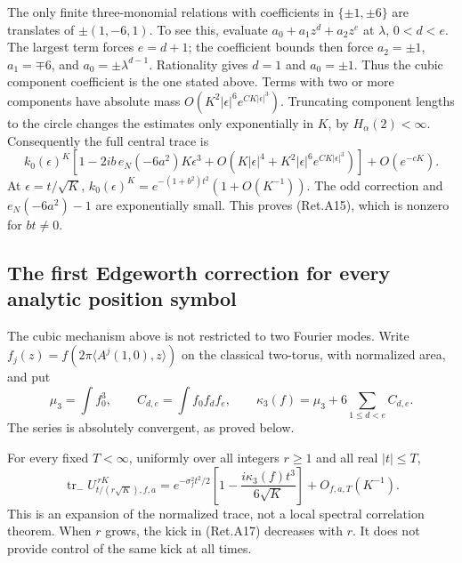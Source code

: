 The only finite three-monomial relations with coefficients in
\(\{\pm1,\pm6\}\) are translates of \(\pm(1,-6,1)\).
To see this, evaluate \(a_0+a_1z^d+a_2z^e\) at \(\lambda\), \(0<d<e\).
The largest term forces \(e=d+1\); the coefficient bounds then force
\(a_2=\pm1\), \(a_1=\mp6\), and
\(a_0=\pm\lambda^{d-1}\). Rationality gives \(d=1\) and \(a_0=\pm1\).
Thus the cubic component coefficient is the one stated above.
Terms with two or more components have absolute mass
\(O(K^2|\epsilon|^6e^{CK|\epsilon|^3})\).
Truncating component lengths to the circle changes the estimates only
exponentially in \(K\), by \(H_\alpha(2)<\infty\).
Consequently the full central trace is
\[
 k_0(\epsilon)^K
 \left[1-2ib\,e_N(-6a^2)K\epsilon^3
          +O(K|\epsilon|^4+K^2|\epsilon|^6e^{CK|\epsilon|^3})\right]
                                      +O(e^{-cK}).
\]
At \(\epsilon=t/\sqrt K\), \(k_0(\epsilon)^K =e^{-(1+b^2)t^2}(1+O(K^{-1}))\).
The odd correction and \(e_N(-6a^2)-1\) are exponentially small.
This proves (Ret.A15), which is nonzero for \(bt\ne0\).

\hypertarget{the-first-edgeworth-correction-for-every-analytic-position-symbol}{%
\subsection{The first Edgeworth correction for every analytic position symbol}\label{the-first-edgeworth-correction-for-every-analytic-position-symbol}}

The cubic mechanism above is not restricted to two Fourier modes.
Write \(f_j(z)=f(2\pi\langle A^j(1,0),z\rangle)\) on the classical
two-torus, with normalized area, and put
\[
 \mu_3=\int f_0^3,\qquad
 C_{d,e}=\int f_0 f_d f_e,\qquad
 \kappa_3(f)=\mu_3+6\sum_{1\le d<e}C_{d,e}.                 \tag{Ret.A16}
\]
The series is absolutely convergent, as proved below.

\begin{theorem}\label{pass1:return_position-2} For every fixed \(T<\infty\), uniformly over all integers
\(r\ge1\) and all real \(|t|\le T\),
\[
 \operatorname{tr}_-
 U_{t/(r\sqrt K),f,a}^{\,rK}
 =e^{-\sigma_f^2t^2/2}
       \left[1-\frac{i\kappa_3(f)t^3}{6\sqrt K}\right]
       +O_{f,a,T}(K^{-1}).                                 \tag{Ret.A17}
\]
This is an expansion of the normalized trace, not a local spectral
correlation theorem. When \(r\) grows, the kick in (Ret.A17) decreases with \(r\).
It does not provide control of the same kick at all times.
\end{theorem}

